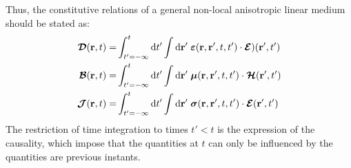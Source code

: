 Thus, the constitutive relations of a general non-local anisotropic linear medium should be stated as:
\begin{subequations}
	\begin{align}
	\boldsymbol{\mathcal{D}}(\mathbf{r}, t) 
	= &
	\int_{t'=-\infty}^t \mathop{}\!\mathrm{d} t'
	\int \mathop{}\!\mathrm{d} \mathbf{r}' \;
	\boldsymbol{\varepsilon}(\mathbf{r},\mathbf{r}', t,t') \cdot \boldsymbol{\mathcal{E}})(\mathbf{r}', t') 
	\\
	\boldsymbol{\mathcal{B}}(\mathbf{r}, t)
	=& 
	\int_{t'=-\infty}^t \mathop{}\!\mathrm{d} t'
	\int \mathop{}\!\mathrm{d} \mathbf{r}' \;
	\boldsymbol{\mu}(\mathbf{r},\mathbf{r}', t,t') \cdot \boldsymbol{\mathcal{H}}(\mathbf{r}', t')  
	\\
	\boldsymbol{\mathcal{J}}(\mathbf{r}, t)
	=& 
	\int_{t'=-\infty}^t \mathop{}\!\mathrm{d} t'
	\int \mathop{}\!\mathrm{d} \mathbf{r}' \;
	\boldsymbol{\sigma}(\mathbf{r},\mathbf{r}', t,t') \cdot \boldsymbol{\mathcal{E}}(\mathbf{r}', t')  
	\end{align}
\end{subequations}
The restriction of time integration to times $t'<t$ is the expression of the causality, which impose that the quantities at $t$ can only be influenced by the quantities are previous instants.

